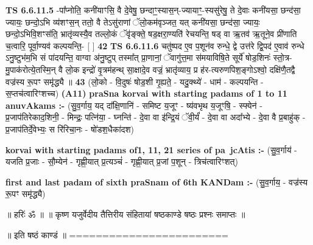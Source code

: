 \documentclass[17pt]{extarticle}
\begin{document}
                  \newline
                                \textbf{ TS 6.6.11.5} \newline
                  -पा᳚प्नोति॒ कनी॑याꣳसि॒ वै दे॒वेषु॒ छन्दाꣳ॒॒स्यास॒न्-ज्यायाꣳ॒॒-स्यसु॑रेषु॒ ते दे॒वाः कनी॑यसा॒ छन्द॑सा॒ ज्यायः॒ छन्दो॒ऽभि व्य॑शꣳस॒न् ततो॒ वै तेऽसु॑राणां ॅलो॒कम॑वृञ्जत॒ यत् कनी॑यसा॒ छन्द॑सा॒ ज्यायः॒ छन्दो॒ऽभिवि॒शꣳस॑ति॒ भ्रातृ॑व्यस्यै॒व तल्लो॒कं ॅवृ॑ङ्क्ते॒ षड॒क्षरा॒ण्यति॑ रेचयन्ति॒ षड् वा ऋ॒तव॑ ऋ॒तूने॒व प्री॑णाति च॒त्वारि॒ पूर्वा॒ण्यव॑ कल्पयन्ति॒- [  ] \textbf{  42} \newline
                  \newline
                                \textbf{ TS 6.6.11.6} \newline
                  चतु॑ष्पद ए॒व प॒शून॑व रुन्धे॒ द्वे उत्त॑रे द्वि॒पद॑ ए॒वाव॑ रुन्धे ऽनु॒ष्टुभ॑म॒भि सं पा॑दयन्ति॒ वाग्वा अ॑नु॒ष्टुप् तस्मा᳚त् प्रा॒णानां॒ ॅवागु॑त्त॒मा स॑मयाविषि॒ते सूर्ये॑ षोड॒शिनः॑ स्तो॒त्र-मु॒पाक॑रोत्ये॒तस्मि॒न् वै लो॒क इन्द्रो॑ वृ॒त्रम॑हन्थ् सा॒क्षादे॒व वज्रं॒ भ्रातृ॑व्याय॒ प्र ह॑र-त्यरुणपिश॒ङ्गोऽश्वो॒ दक्षि॑णै॒तद्वै वज्र॑स्य रू॒पꣳ समृ॑द्ध्यै ॥ \textbf{  43} \newline
                  \newline
                      (लो॒को - वि॒दुषः॑ षोड॒शी गृ॒ह्यते॒ - यदु॒क्थ्ये॑ - धाम॑ - कल्पयन्ति - स॒प्तच॑त्वारिꣳशच्च)  \textbf{(A11)} \newline \newline
                \textbf{praSna korvai with starting padams of 1 to 11 anuvAkams :-} \newline
        (सु॒व॒र्गाय॒ यद् दा᳚क्षि॒णानि॑ - समिष्ट य॒जूꣳ - ष्य॑वभृथ य॒जूꣳषि॒ - स्फ्येन॑ - प्र॒जाप॑तिरेकाद॒शिनी॒ - मिन्द्रः॒ पत्नि॑या॒ - घ्नन्ति॑ - दे॒वा वा इ॑न्द्रि॒यं ॅवी॒र्यं॑ - दे॒वा वा अदा᳚भ्ये - दे॒वा वै प्र॒बाहु॑क् - प्र॒जाप॑तिर्दे॒वेभ्यः॒ स रि॑रिचा॒नः - षो॑डश॒धैका॑दश) \newline

        \textbf{korvai with starting padams of1, 11, 21 series of pa~jcAtis :-} \newline
        (सु॒व॒र्गाय॑ - यजति प्र॒जाः - सौ॒म्येन॑ - गृह्णी॒यात् प्र॒त्यञ्चं॑ - गृह्णी॒यात् प्र॒जां प॒शून् - त्रिच॑त्वारिꣳशत्) \newline

        \textbf{first and last padam of sixth praSnam of 6th KANDam :-} \newline
        (सु॒व॒र्गाय॒ - वज्र॑स्य रू॒पꣳ समृ॑द्ध्यै) \newline 

        
        ॥ हरिः॑ ॐ ॥
॥ कृष्ण यजुर्वेदीय तैत्तिरीय संहितायां षष्ठकाण्डे षष्ठः प्रश्नः समाप्तः ॥

॥ इति षष्ठं काण्डं ॥
======================== \newline
        \pagebreak
                \pagebreak
        
\end{document}
